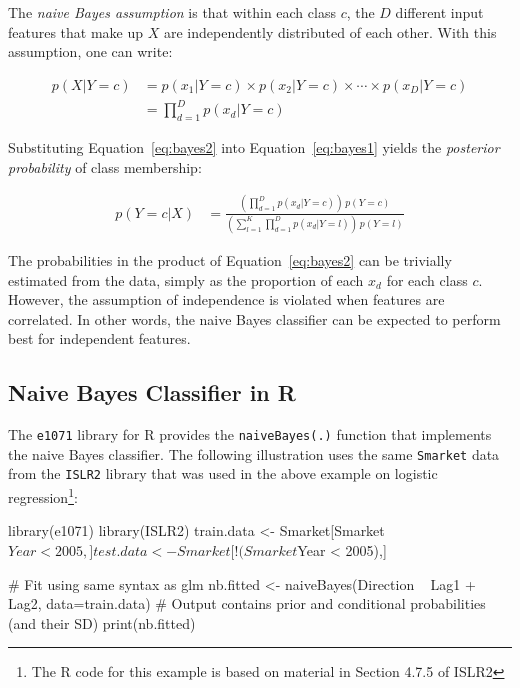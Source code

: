 The \emph{naive Bayes assumption} is that within each class $c$, the $D$ different input features that make up $X$ are independently distributed of each other. With this assumption, one can write:

\begin{align}
p(X | Y=c ) &= p(x_1 | Y=c) \times p(x_2 | Y=c) \times \cdots \times p(x_D | Y=c) \nonumber \\
            &= \prod_{d=1}^D p(x_d | Y=c) \label{eq:bayes2}
\end{align}

\noindent Substituting Equation~\ref{eq:bayes2} into Equation~\ref{eq:bayes1} yields the \emph{posterior probability} of class membership:

\begin{align*}
p(Y=c|X) &= \frac{\left(\prod_{d=1}^D p(x_d | Y=c)\right) \, p(Y=c)}{\left(\sum_{l=1}^K \prod_{d=1}^D p(x_d | Y=l)\right) \, p(Y=l) } 
\end{align*}

The probabilities in the product of Equation~\ref{eq:bayes2} can be trivially estimated from the data, simply as the proportion of each $x_d$ for each class $c$. However, the assumption of independence is violated when features are correlated. In other words, the naive Bayes classifier can be expected to perform best for independent features.

\subsection{Naive Bayes Classifier in R}

The \texttt{e1071} library for R provides the \texttt{naiveBayes(.)} function that implements the naive Bayes classifier. The following illustration uses the same \texttt{Smarket} data from the \texttt{ISLR2} library that was used in the above example on logistic regression\footnote{The R code for this example is based on material in Section 4.7.5 of ISLR2}:

\begin{samepage}
\begin{Rcode}
library(e1071)
library(ISLR2)
train.data <- Smarket[Smarket$Year < 2005,]
test.data <- Smarket[!(Smarket$Year < 2005),]

# Fit using same syntax as glm
nb.fitted <- naiveBayes(Direction ~ Lag1 + Lag2, data=train.data)
# Output contains prior and conditional probabilities (and their SD)
print(nb.fitted)
\end{Rcode}
\end{samepage}

